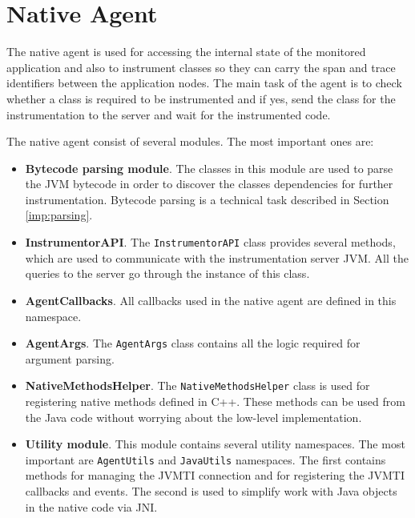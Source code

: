 \section{Native Agent}
\label{native_agent_design}
The native agent is used for accessing the internal state of the monitored application and also to instrument classes so they can carry the span and trace identifiers between the application nodes. The main task of the agent is to check whether a class is required to be instrumented and if yes, send the class for the instrumentation to the server and wait for the instrumented code.

The native agent consist of several modules. The most important ones are:
\begin{itemize}
	\item \textbf{Bytecode parsing module}. \newline The classes in this module are used to parse the JVM bytecode in order to discover the classes dependencies for further instrumentation. Bytecode parsing is a technical task described in Section \ref{imp:parsing}.
	\item \textbf{InstrumentorAPI}. \newline The \texttt{InstrumentorAPI} class provides several methods, which are used to communicate with the instrumentation server JVM. All the queries to the server go through the instance of this class.
	\item \textbf{AgentCallbacks}. \newline All callbacks used in the native agent are defined in this namespace.
	\item \textbf{AgentArgs}.  \newline The \texttt{AgentArgs} class contains all the logic required for argument parsing.
	\item \textbf{NativeMethodsHelper}. \newline The \texttt{NativeMethodsHelper} class is used for registering native methods defined in C++. These methods can be used from the Java code without worrying about the low-level implementation.
	\item \textbf{Utility module}. \newline This module contains several utility namespaces. The most important are \texttt{AgentUtils} and \texttt{JavaUtils} namespaces. The first contains methods for managing the JVMTI connection and for registering the JVMTI callbacks and events. The second is used to simplify work with Java objects in the native code via JNI.
\end{itemize}

